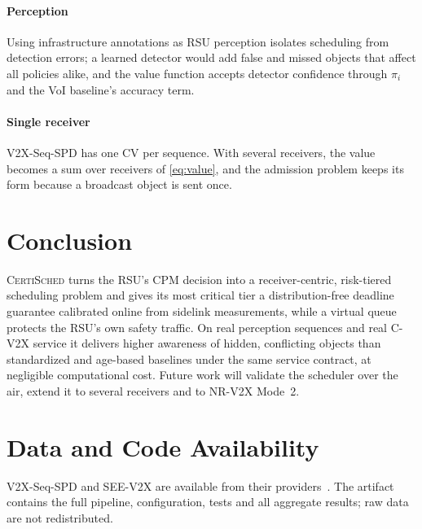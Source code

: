 \documentclass[journal]{IEEEtran}
\theoremstyle{remark}
\newcommand{\cs}{\textsc{CertiSched}}
\begin{document}
\paragraph*{Perception} Using infrastructure annotations as RSU perception isolates scheduling from detection errors; a learned detector would add false and missed objects that affect all policies alike, and the value function accepts detector confidence through $\pi_i$ and the VoI baseline's accuracy term.
\paragraph*{Single receiver} V2X-Seq-SPD has one CV per sequence. With several receivers, the value becomes a sum over receivers of \eqref{eq:value}, and the admission problem keeps its form because a broadcast object is sent once.

\section{Conclusion}
\cs{} turns the RSU's CPM decision into a receiver-centric, risk-tiered scheduling problem and gives its most critical tier a distribution-free deadline guarantee calibrated online from sidelink measurements, while a virtual queue protects the RSU's own safety traffic. On real perception sequences and real C-V2X service it delivers higher awareness of hidden, conflicting objects than standardized and age-based baselines under the same service contract, at negligible computational cost. Future work will validate the scheduler over the air, extend it to several receivers and to NR-V2X Mode~2.

\section*{Data and Code Availability}
V2X-Seq-SPD and SEE-V2X are available from their providers~\cite{v2xseq,seev2x}. The artifact contains the full pipeline, configuration, tests and all aggregate results; raw data are not redistributed.



\end{document}
